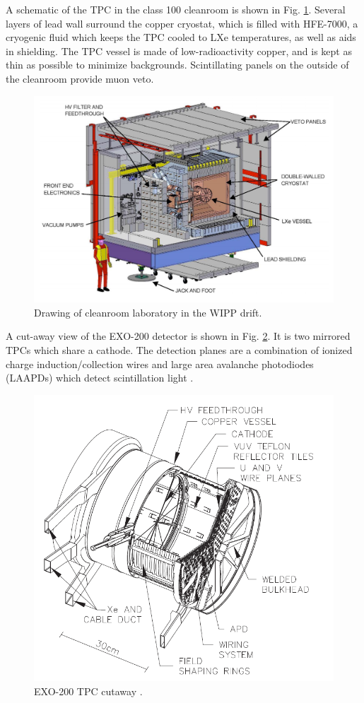 A schematic of the TPC in the class 100 cleanroom is shown in Fig. \ref{fig:cleanroom}.  Several layers of lead wall surround the copper cryostat, which is filled with HFE-7000, a cryogenic fluid which keeps the TPC cooled to LXe temperatures, as well as aids in shielding.  The TPC vessel is made of low-radioactivity copper, and is kept as thin as possible to minimize backgrounds.  Scintillating panels on the outside of the cleanroom provide muon veto.

\begin{figure}[H]
	\centering
	\includegraphics[width=.7\textwidth]{figures/cleanroom.png}
	\caption{Drawing of cleanroom laboratory in the WIPP drift.}
\label{fig:cleanroom}
\end{figure}

A cut-away view of the EXO-200 detector is shown in Fig. \ref{fig:tpc}.  It is two mirrored TPCs which share a cathode.  The detection planes are a combination of ionized charge induction/collection wires and large area avalanche photodiodes (LAAPDs) which detect scintillation light \cite{APDs}.

\begin{figure}[H]
	\centering
	\includegraphics[width=.9\textwidth]{figures/TPC.png}
	\caption{EXO-200 TPC cutaway \cite{EXO200TwoNuLong}.}
\label{fig:tpc}
\end{figure}


